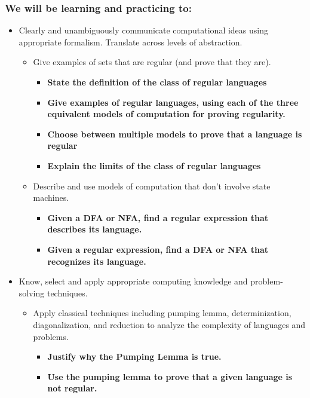 \subsubsection*{We will be learning and practicing to:}

\vspace{-15pt}

\begin{itemize}
\item Clearly and unambiguously communicate computational ideas using appropriate formalism. Translate across levels of abstraction.
\begin{itemize}
   \item Give examples of sets that are regular (and prove that they are).
   \begin{itemize}
      \item {\bf State the definition of the class of regular languages}
      \item {\bf Give examples of regular languages, using each of the three equivalent models of computation for proving regularity.}
      \item {\bf Choose between multiple models to prove that a language is regular}
      \item {\bf Explain the limits of the class of regular languages}
   \end{itemize}
   \item Describe and use models of computation that don't involve state machines.
   \begin{itemize}
      \item {\bf Given a DFA or NFA, find a regular expression that describes its language.}
      \item {\bf Given a regular expression, find a DFA or NFA that recognizes its language.}
   \end{itemize}
\end{itemize}

\item Know, select and apply appropriate computing knowledge and problem-solving techniques. 
\begin{itemize}
\item Apply classical techniques including pumping lemma, determinization, diagonalization, and reduction to analyze the complexity of languages and problems.
\begin{itemize}
    \item {\bf Justify why the Pumping Lemma is true.}
    \item {\bf Use the pumping lemma to prove that a given language is not regular.}
\end{itemize}
\end{itemize}


\end{itemize}

